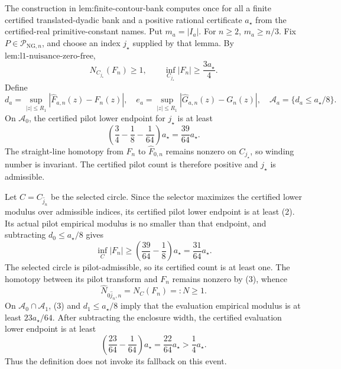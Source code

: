 The construction in \(\text{lem:finite-contour-bank}\) computes once for all a finite certified translated-dyadic bank and a positive rational certificate \(a_{\star}\) from the certified-real primitive-constant names. Put \(m_a=|I_a|\). For \(n\ge2\), \(m_a\ge n/3\). Fix \(P\in\mathcal P_{\mathrm{NG},n}\), and choose an index \(j_{\star}\) supplied by that lemma. By \(\text{lem:l1-nuisance-zero-free}\),
\[
 N_{C_{j_{\star}}}(F_n)\ge1,
 \qquad
 \inf_{C_{j_{\star}}}|F_n|
 \ge\frac{3a_{\star}}4. \tag{1}
\]
Define
\[
 d_a=\sup_{|z|\le R_1}|\widehat F_{a,n}(z)-F_n(z)|,
 \quad
 e_a=\sup_{|z|\le R_1}|\widehat G_{a,n}(z)-G_n(z)|,
 \quad
 \mathcal A_a=\{d_a\le a_{\star}/8\}.
\]
On \(\mathcal A_0\), the certified pilot lower endpoint for \(j_{\star}\) is at least
\[
 \left(\frac34-\frac18-\frac1{64}\right)a_{\star}
 =\frac{39}{64}a_{\star}. \tag{2}
\]
The straight-line homotopy from \(F_n\) to \(\widehat F_{0,n}\) remains nonzero on \(C_{j_{\star}}\), so winding number is invariant. The certified pilot count is therefore positive and \(j_{\star}\) is admissible.

Let \(C=C_{\widehat j_n}\) be the selected circle. Since the selector maximizes the certified lower modulus over admissible indices, its certified pilot lower endpoint is at least (2). Its actual pilot empirical modulus is no smaller than that endpoint, and subtracting \(d_0\le a_{\star}/8\) gives
\[
 \inf_C|F_n|
 \ge\left(\frac{39}{64}-\frac18\right)a_{\star}
 =\frac{31}{64}a_{\star}. \tag{3}
\]
The selected circle is pilot-admissible, so its certified count is at least one. The homotopy between its pilot transform and \(F_n\) remains nonzero by (3), whence
\[
 \widehat N_{0\widehat j_n,n}=N_C(F_n)=:N\ge1. \tag{4}
\]
On \(\mathcal A_0\cap\mathcal A_1\), (3) and \(d_1\le a_{\star}/8\) imply that the evaluation empirical modulus is at least \(23a_{\star}/64\). After subtracting the enclosure width, the certified evaluation lower endpoint is at least
\[
 \left(\frac{23}{64}-\frac1{64}\right)a_{\star}
 =\frac{22}{64}a_{\star}>\frac14a_{\star}. \tag{5}
\]
Thus the definition does not invoke its fallback on this event.

